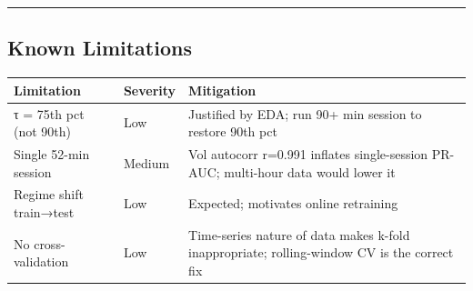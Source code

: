 \documentclass[
]{article}
\begin{document}
\begin{center}\rule{0.5\linewidth}{0.5pt}\end{center}

\hypertarget{known-limitations}{%
\subsection{Known Limitations}\label{known-limitations}}

\begin{longtable}[]{@{}
  >{\raggedright\arraybackslash}p{}
  >{\raggedright\arraybackslash}p{}
  >{\raggedright\arraybackslash}p{}@{}}
\toprule
Limitation & Severity & Mitigation \\
\midrule
\endhead
τ = 75th pct (not 90th) & Low & Justified by EDA; run 90+ min session to
restore 90th pct \\
Single 52-min session & Medium & Vol autocorr r=0.991 inflates
single-session PR-AUC; multi-hour data would lower it \\
Regime shift train→test & Low & Expected; motivates online retraining \\
No cross-validation & Low & Time-series nature of data makes k-fold
inappropriate; rolling-window CV is the correct fix \\
\bottomrule
\end{longtable}
\end{document}

